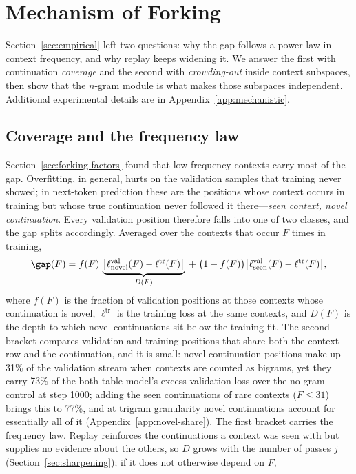 \section{Mechanism of Forking}
\label{sec:mechanism}

Section~\ref{sec:empirical} left two questions: why the gap follows a power law in context frequency, and why replay keeps widening it. We answer the first with continuation \emph{coverage} and the second with \emph{crowding-out} inside context subspaces, then show that the $n$-gram module is what makes those subspaces independent. Additional experimental details are in Appendix~\ref{app:mechanistic}.

\subsection{Coverage and the frequency law}
\label{sec:coverage}
Section~\ref{sec:forking-factors} found that low-frequency contexts carry most of the gap. Overfitting, in general, hurts on the validation samples that training never showed; in next-token prediction these are the positions whose context occurs in training but whose true continuation never followed it there---\emph{seen context, novel continuation}. Every validation position therefore falls into one of two classes, and the gap splits accordingly. Averaged over the contexts that occur $F$ times in training,
\begin{equation}
\gap(F)=f(F)\,\underbrace{\big[\ell^{\mathrm{val}}_{\mathrm{novel}}(F)-\ell^{\mathrm{tr}}(F)\big]}_{D(F)}
\;+\;\big(1-f(F)\big)\big[\ell^{\mathrm{val}}_{\mathrm{seen}}(F)-\ell^{\mathrm{tr}}(F)\big],
\label{eq:gap-decomp}
\end{equation}
where $f(F)$ is the fraction of validation positions at those contexts whose continuation is novel, $\ell^{\mathrm{tr}}$ is the training loss at the same contexts, and $D(F)$ is the depth to which novel continuations sit below the training fit. The second bracket compares validation and training positions that share both the context row and the continuation, and it is small: novel-continuation positions make up 31\% of the validation stream when contexts are counted as bigrams, yet they carry 73\% of the both-table model's excess validation loss over the no-gram control at step 1000; adding the seen continuations of rare contexts ($F\le 31$) brings this to 77\%, and at trigram granularity novel continuations account for essentially all of it (Appendix~\ref{app:novel-share}). The first bracket carries the frequency law. Replay reinforces the continuations a context was seen with but supplies no evidence about the others, so $D$ grows with the number of passes $j$ (Section~\ref{sec:sharpening}); if it does not otherwise depend on $F$,

